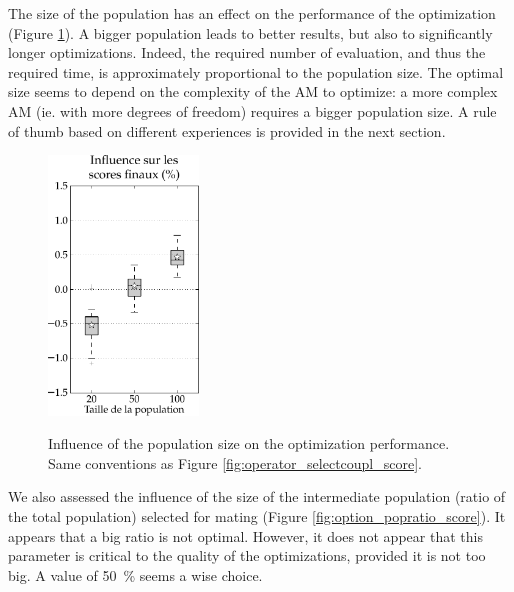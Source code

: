 \documentclass[twocol]{ametsoc}
\begin{document}
The size of the population has an effect on the performance of the optimization (Figure \ref{fig:option_taillepop_score}). A bigger population leads to better results, but also to significantly longer optimizations. Indeed, the required number of evaluation, and thus the required time, is approximately proportional to the population size. The optimal size seems to depend on the complexity of the AM to optimize: a more complex AM (ie. with more degrees of freedom) requires a bigger population size. A rule of thumb based on different experiences is provided in the next section.

\begin{figure}[htb]
	\begin{center}
		\noindent\includegraphics[width=4cm,angle=0]{figures/option_taillepop_score.pdf}\\
	\end{center}
	\caption{Influence of the population size on the optimization performance. Same conventions as Figure \ref{fig:operator_selectcoupl_score}.}
	\label{fig:option_taillepop_score}
\end{figure}

We also assessed the influence of the size of the intermediate population (ratio of the total population) selected for mating (Figure \ref{fig:option_popratio_score}). It appears that a big ratio is not optimal. However, it does not appear that this parameter is critical to the quality of the optimizations, provided it is not too big. A value of 50~\% seems a wise choice.
\end{document}
